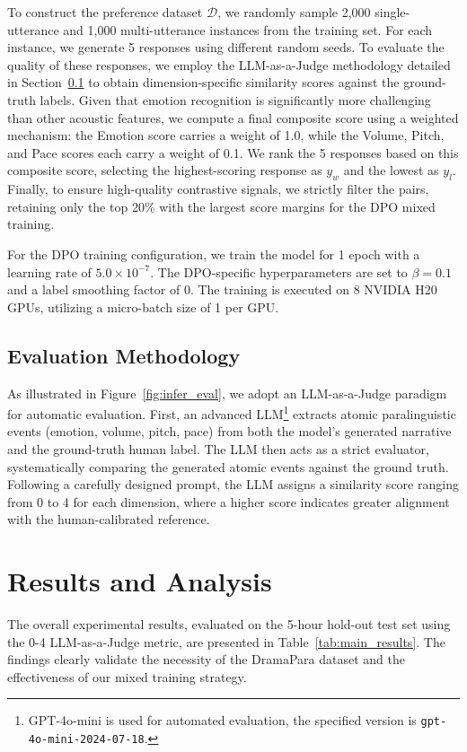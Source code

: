 \documentclass{Interspeech}
\begin{document}
To construct the preference dataset $\mathcal{D}$, we randomly sample 2,000 single-utterance and 1,000 multi-utterance instances from the training set. For each instance, we generate 5 responses using different random seeds. To evaluate the quality of these responses, we employ the LLM-as-a-Judge methodology detailed in Section~\ref{subsec:eval} to obtain dimension-specific similarity scores against the ground-truth labels. Given that emotion recognition is significantly more challenging than other acoustic features, we compute a final composite score using a weighted mechanism: the Emotion score carries a weight of 1.0, while the Volume, Pitch, and Pace scores each carry a weight of 0.1. We rank the 5 responses based on this composite score, selecting the highest-scoring response as $y_w$ and the lowest as $y_l$. Finally, to ensure high-quality contrastive signals, we strictly filter the pairs, retaining only the top 20\% with the largest score margins for the DPO mixed training.

For the DPO training configuration, we train the model for 1 epoch with a learning rate of $5.0 \times 10^{-7}$. The DPO-specific hyperparameters are set to $\beta = 0.1$ and a label smoothing factor of $0$. The training is executed on 8 NVIDIA H20 GPUs, utilizing a micro-batch size of 1 per GPU.

\subsection{Evaluation Methodology}
\label{subsec:eval}
As illustrated in Figure~\ref{fig:infer_eval}, we adopt an LLM-as-a-Judge paradigm for automatic evaluation. First, an advanced LLM\footnote{GPT-4o-mini is used for automated evaluation, the specified version is  \texttt{gpt-4o-mini-2024-07-18}.} extracts atomic paralinguistic events (emotion, volume, pitch, pace) from both the model's generated narrative and the ground-truth human label. The LLM then acts as a strict evaluator, systematically comparing the generated atomic events against the ground truth. Following a carefully designed prompt, the LLM assigns a similarity score ranging from 0 to 4 for each dimension, where a higher score indicates greater alignment with the human-calibrated reference.

\section{Results and Analysis}
\label{sec:results}

The overall experimental results, evaluated on the 5-hour hold-out test set using the 0-4 LLM-as-a-Judge metric, are presented in Table~\ref{tab:main_results}. The findings clearly validate the necessity of the DramaPara dataset and the effectiveness of our mixed training strategy.
\end{document}
